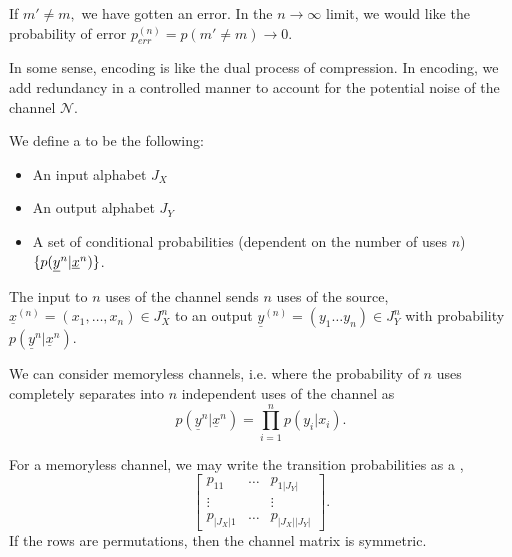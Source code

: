 If $m'\neq m,$ we have gotten an error. In the $n\to \infty$ limit, we would like the probability of error $p_{err}^{(n)}=p(m'\neq m) \to 0$.

In some sense, encoding is like the dual process of compression. In encoding, we add redundancy in a controlled manner to account for the potential noise of the channel $\mathcal{N}$.

\begin{defn}
    We define a  to be the following:
    \begin{itemize}
        \item An input alphabet $J_X$
        \item An output alphabet $J_Y$
        \item A set of conditional probabilities (dependent on the number of uses $n$) $\{p(\underline y^{n}| \underline x^{n})\}$.
    \end{itemize}
\end{defn}
The input to $n$ uses of the channel sends $n$ uses of the source, $\underline{x}^{(n)}=(x_1,\ldots, x_n)\in J_X^n$ to an output $\underline{y}^{(n)}=(y_1\ldots y_n)\in J_Y^n$ with probability $p(\underline y^{n}| \underline x^{n})$.

We can consider memoryless channels, i.e. where the probability of $n$ uses completely separates into $n$ independent uses of the channel as
\begin{equation}
    p(\underline y^{n}| \underline x^{n}) = \prod_{i=1}^n p(y_i | x_i).
\end{equation}

For a memoryless channel, we may write the transition probabilities as a ,
\begin{equation}
    \begin{bmatrix}
    p_{11} & \ldots & p_{1|J_Y|}\\
    \vdots & & \vdots\\
    p_{|J_X|1} & \ldots &p_{|J_X||J_Y|}
    \end{bmatrix}.
\end{equation}
If the rows are permutations, then the channel matrix is symmetric.

